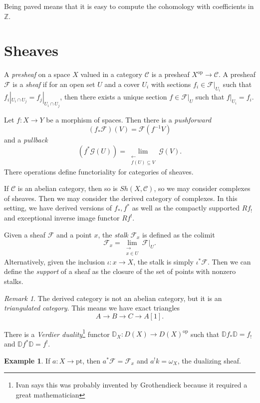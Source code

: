 \documentclass[leqno, openany]{memoir}
\theoremstyle{definition}
\newtheorem{exm}[thm]{Example}
\theoremstyle{remark}
\newtheorem{rmk}[thm]{Remark}
\theoremstyle{plain}
\theoremstyle{definition}
\theoremstyle{remark}
\newcommand{\Z}{\mathbb{Z}}
\newcommand{\mc}[1]{\mathcal{#1}}
\newcommand{\mb}[1]{\mathbb{#1}}
\newcommand{\mr}[1]{\mathrm{#1}}
\begin{document}
Being paved means that it is easy to compute the cohomology with coefficients in $\Z$.

\section{Sheaves}%
\label{sec:sheaves}

A \textit{presheaf} on a space $X$ valued in a category $\mc{C}$ is a presheaf $X^{\mr{op}} \to \mc{C}$. A presheaf $\mc{F}$ is a \textit{sheaf} if for an open set $U$ and a cover $U_i$ with sections $f_i \in \mc{F}|_{U_i}$ such that $f_i |_{U_i \cap U_j} = f_j |_{U_i \cap U_j}$, then there exists a unique section $f \in \mc{F}|_{U}$ such that $f|_{U_i} = f_i$.

Let $f:X \to Y$ be a morphism of spaces. Then there is a \textit{pushforward}
\[ (f_* \mc{F}) (V) = \mc{F}(f^{-1} V) \]
and a \textit{pullback}
\[ (f^* \mc{G} (U)) = \lim_{\substack{\gets \\ f(U) \subseteq V}} \mc{G}(V). \]
There operations define functoriality for categories of sheaves.

If $\mc{C}$ is an abelian category, then so is $Sh(X, \mc{C})$, so we may consider complexes of sheaves. Then we may consider the derived category of complexes. In this setting, we have derived versions of $f_*, f^*$ as well as the compactly supported $Rf_!$ and exceptional inverse image functor $Rf^!$.

Given a sheaf $\mc{F}$ and a point $x$, the \textit{stalk} $\mc{F}_x$ is defined as the colimit
\[ \mc{F}_x = \lim_{\substack{\to \\ x \in U}} \mc{F}|_{U}. \]
Alternatively, given the inclusion $\iota: x \to X$, the stalk is simply $\iota^* \mc{F}$. Then we can define the \textit{support} of a sheaf as the closure of the set of points with nonzero stalks.

\begin{rmk}
    The derived category is not an abelian category, but it is an \textit{triangulated category}. This means we have exact triangles
    \[ A \to B \to C \to A[1]. \]
\end{rmk}

There is a \textit{Verdier duality}\footnote{Ivan says this was probably invented by Grothendieck because it required a great mathematician} functor $\mb{D}_X: D(X) \to D(X)^{\mr{op}}$ such that $\mb{D}f_* \mb{D} = f_!$ and $\mb{D} f^* \mb{D} = f^!$.

\begin{exm}
    If $a: X \to \mr{pt}$, then $a^* \mc{F} = \mc{F}_x$ and $a^! k = \omega_X$, the dualizing sheaf.
\end{exm}
\end{document}
